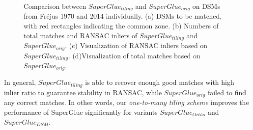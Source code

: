 \begin{figure}[htbp]
\begin{center}
{		}
		\caption{Comparison between $SuperGlue_{tiling}$ and $SuperGlue_{orig}$ on DSMs from Fr{\'e}jus 1970 and 2014 individually. (a) DSMs to be matched, with red rectangles indicating the common zone. (b) Numbers of total matches and RANSAC inliers of $SuperGlue_{tiling}$ and $SuperGlue_{orig}$. (c) Visualization of RANSAC inliers based on $SuperGlue_{tiling}$. (d)Visualization of total matches based on $SuperGlue_{orig}$.}
		\label{MatchDSM}
	\end{center}
\end{figure} 

In general, $SuperGlue_{tiling}$ is able to recover enough good matches with high inlier ratio to guarantee stability in RANSAC, while $SuperGlue_{orig}$ failed to find any correct matches. In other words, our \textit{one-to-many tiling scheme} improves the performance of SuperGlue significantly for variants $SuperGlue_{Ortho}$ and $SuperGlue_{DSM}$.\\

